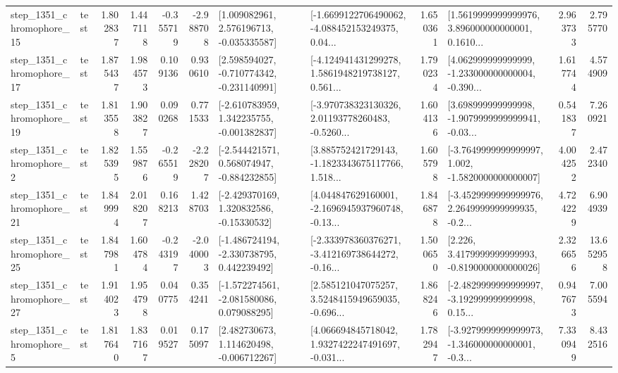 \begin{tabular}{llrrrrllrlrr}
 step\_1351\_chromophore\_15 &      test &      1.802837 &    1.447118 &     -0.355719 & -2.988708 &    [1.009082961, 2.576196713, -0.035335587] &  [-1.6699122706490062, -4.088452153249375, 0.04... &       1.650361 &  [1.5619999999999976, 3.896000000000001, 0.1610... &            2.963733 &          2.795770 \\
 step\_1351\_chromophore\_17 &      test &      1.875437 &    1.984573 &      0.109136 &  0.930610 &   [2.598594027, -0.710774342, -0.231140991] &  [-4.124941431299278, 1.5861948219738127, 0.561... &       1.790234 &  [4.062999999999999, -1.233000000000004, -0.390... &            1.617744 &          4.574909 \\
 step\_1351\_chromophore\_19 &      test &      1.813558 &    1.903827 &      0.090268 &  0.771533 &   [-2.610783959, 1.342235755, -0.001382837] &  [-3.970738323130326, 2.01193778260483, -0.5260... &       1.604136 &  [3.698999999999998, -1.9079999999999941, -0.03... &            0.541837 &          7.260921 \\
  step\_1351\_chromophore\_2 &      test &      1.825395 &    1.559876 &     -0.265519 & -2.228207 &   [-2.544421571, 0.568074947, -0.884232855] &  [3.885752421729143, -1.1823343675117766, 1.518... &       1.605798 &  [-3.7649999999999997, 1.002, -1.5820000000000007] &            4.004252 &          2.472340 \\
 step\_1351\_chromophore\_21 &      test &      1.849994 &    2.018207 &      0.168213 &  1.428703 &    [-2.429370169, 1.320832586, -0.15330532] &  [4.044847629160001, -2.1696945937960748, -0.13... &       1.846878 &  [-3.4529999999999976, 2.2649999999999935, -0.2... &            4.724229 &          6.904939 \\
 step\_1351\_chromophore\_25 &      test &      1.847981 &    1.604784 &     -0.243197 & -2.040003 &   [-1.486724194, -2.330738795, 0.442239492] &  [-2.333978360376271, -3.412169738644272, -0.16... &       1.500650 &   [2.226, 3.4179999999999993, -0.8190000000000026] &            2.326656 &         13.652958 \\
 step\_1351\_chromophore\_27 &      test &      1.914023 &    1.954798 &      0.040775 &  0.354241 &   [-1.572274561, -2.081580086, 0.079088295] &  [2.585121047075257, 3.5248415949659035, -0.696... &       1.868246 &  [-2.4829999999999997, -3.192999999999998, 0.15... &            0.947673 &          7.005594 \\
  step\_1351\_chromophore\_5 &      test &      1.817640 &    1.837167 &      0.019527 &  0.175097 &    [2.482730673, 1.114620498, -0.006712267] &  [4.066694845718042, 1.9327422247491697, -0.031... &       1.782947 &  [-3.9279999999999973, -1.346000000000001, -0.3... &            7.330949 &          8.432516 \\

\end{tabular}
